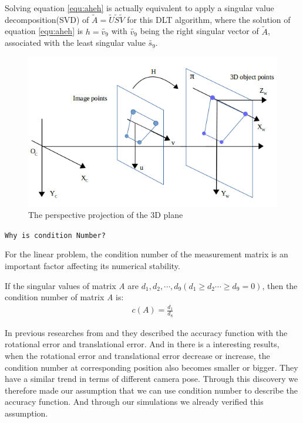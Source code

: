 Solving equation \ref{equ:aheh} is actually equivalent to apply a singular value decomposition(SVD) of $\widetilde{A} = \widetilde{U}\widetilde{S}\widetilde{V}$ for this DLT algorithm, where the solution of equation \ref{equ:aheh} is $ h = \widetilde{v_9}$ with $\widetilde{v_9}$ being the right singular vector of $\widetilde{A}$, associated with the least singular value $\widetilde{s_9}$.

\begin{figure}[H]
\centering
\includegraphics[scale=0.5]{./fig/H.png}
\caption{The perspective projection of the 3D plane}  
\label{fig:H}
\end{figure}

\texttt{Why is condition Number?}
 
For the linear problem, the condition number of the measurement matrix is an important factor affecting its numerical stability.

If the singular values of matrix \textit{A} are $d_1,d_2,\dotsm ,d_9(d_1 \geq d_2 \dotsm \geq d_9 = 0)$, then the condition number of matrix \textit{A} is:
\begin{align*}
c(A) = \frac{d_1}{d_8}
\end{align*}

In previous researches from \cite{abawi2004accuracy} and \cite{pentenrieder2006analysis} they described the accuracy function with the rotational error and translational error. And in \cite{dynamic_markers} there is a interesting results, when the rotational error and translational error decrease or increase, the condition number at corresponding position also becomes smaller or bigger. They have a similar trend in terms of different camera pose. Through this discovery we therefore made our assumption that we can use condition number to describe the accuracy function. And through our simulations we already verified this assumption.

